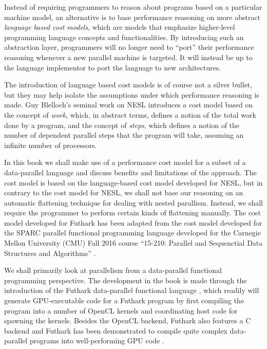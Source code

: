 \documentclass[11pt]{book}
\begin{document}
Instead of requiring programmers to reason about programs based on a
particular machine model, an alternative is to base performance
reasoning on more abstract \emph{language based cost models}, which
are models that emphasize higher-level programming language concepts and
functionalities. By introducing such an abstraction layer, programmers will
no longer need to ``port'' their performance reasoning whenever a new
parallel machine is targeted. It will instead be up to the language
implementor to port the language to new architectures.

The introduction of language based cost models is of course not a
silver bullet, but they may help isolate the assumptions under which
performance reasoning is made. Guy Blelloch's seminal work on NESL
\cite{blelloch1990vector,blelloch1994implementation} introduces a cost
model based on the concept of \emph{work}, which, in abstract terms,
defines a notion of the total work done by a program, and the concept
of \emph{steps}, which defines a notion of the number of dependent
parallel steps that the program will take, assuming an infinite number
of processors.

In this book we shall make use of a performance cost model for a
subset of a data-parallel language and discuss benefits and
limitations of the approach. The cost model is based on the
language-based cost model developed for NESL, but in contrary to the
cost model for NESL, we shall not base our reasoning on an automatic
flattening technique for dealing with nested parallism. Instead, we
shall require the programmer to perform certain kinds of flattening
manually. The cost model developed for Futhark has been adapted from
the cost model developed for the SPARC parallel functional programming
language developed for the Carnegie Mellon University (CMU) Fall 2016
course ``15-210: Parallel and Sequenctial Data Structures and
Algorithms'' \cite{algdesign:parseq2016}.

We shall primarily look at parallelism from a data-parallel functional
programming perspective. The development in the book is made through
the introduction of the Futhark data-parallel functional language
\cite{henriksen2014size,henriksen2016design,henriksen2014bounds,henriksen2013t2},
which readily will generate GPU-executable code for a Futhark program
by first compiling the program into a number of OpenCL kernels and
coordinating host code for spawning the kernels. Besides the OpenCL
backend, Futhark also features a C backend and Futhark has been
demonstrated to compile quite complex data-parallel programs into
well-performing GPU code \cite{finpar,apltofuthark2016}.
\end{document}
